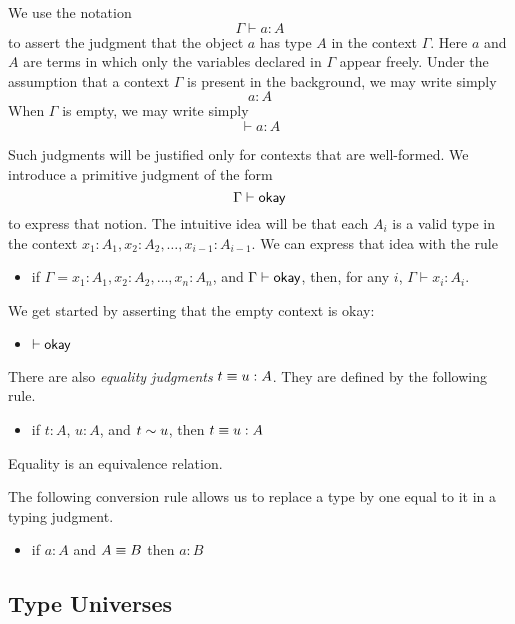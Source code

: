 We use the notation
\[
  \Gamma \vdash a:A
\]
to assert the judgment that the object $a$ has type $A$ in the context
$\Gamma$.  Here $a$ and $A$ are terms in which only the variables declared in
$\Gamma$ appear freely.  Under the assumption that a context $\Gamma$ is
present in the background, we may write simply
\[
  a:A
\]
When $\Gamma$ is empty, we may write simply
\[
  \vdash a:A
\]

Such judgments will be justified only for contexts that are well-formed.  We
introduce a primitive judgment of the form
\[
  \Gamma \vdash \mathop{\textsf{okay}}
\]
to express that notion.  The intuitive idea will be that each $A_i$ is a valid
type in the context $x_1:A_1, x_2:A_2,\dots,x_{i-1}:A_{i-1}$.  We can express that idea with 
the rule
\begin{itemize}
\item if $\Gamma =  x_1:A_1, x_2:A_2,\dots,x_n:A_n$, and $\Gamma \vdash \mathop{\textsf{okay}}$, then, for any $i$, $\Gamma \vdash x_i : A_i$.
\end{itemize}
We get started by asserting that the empty context is okay:
\begin{itemize}
\item $\vdash \mathop{\textsf{okay}}$
\end{itemize}
There are also {\em equality judgments} $t \equiv u : A$.  They are defined by
the following rule.
\begin{itemize}
\item if $t:A$, $u:A$, and $t \sim u$, then $t \equiv u : A$
\end{itemize}
Equality is an equivalence relation.


The following conversion rule allows us to replace a type by one equal to it in
a typing judgment.
\begin{itemize}
\item if $a:A$ and $A \equiv B$ then $a:B$
\end{itemize}

\subsection*{Type Universes}

